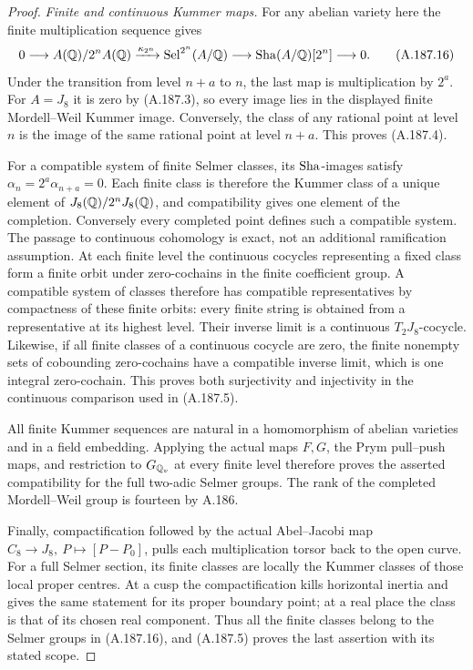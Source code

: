 \begin{proof}
\emph{Finite and continuous Kummer maps.}
For any abelian variety here the finite multiplication
sequence gives
\[
0\longrightarrow A(\mathbb Q)/2^nA(\mathbb Q)
 \xrightarrow{\kappa_{2^n}}\operatorname{Sel}^{2^n}(A/\mathbb Q)
 \longrightarrow\operatorname{Sha}(A/\mathbb Q)[2^n]\longrightarrow0.
\tag{A.187.16}
\]
Under the transition from level \(n+a\) to \(n\),
the last map is multiplication by \(2^a\).  For
\(A=J_8\) it is zero by (A.187.3), so every image
lies in the displayed finite Mordell--Weil Kummer
image.  Conversely, the class of any rational point
at level \(n\) is the image of the same rational
point at level \(n+a\).  This proves (A.187.4).

For a compatible system of finite Selmer classes,
its \(\operatorname{Sha}\)-images satisfy \(\alpha_n=2^a\alpha_{n+a}=0\).
Each finite class is therefore the Kummer class of a
unique element of \(J_8(\mathbb Q)/2^nJ_8(\mathbb Q)\), and
compatibility gives one element of the completion.
Conversely every completed point defines such a
compatible system.  The passage to continuous
cohomology is exact, not an additional ramification
assumption.  At each finite level the continuous
cocycles representing a fixed class form a finite
orbit under zero-cochains in the finite coefficient
group.  A compatible system of classes therefore
has compatible representatives by compactness of
these finite orbits: every finite string is obtained
from a representative at its highest level.
Their inverse limit is a continuous \(T_2J_8\)-cocycle.
Likewise, if all finite classes of a continuous
cocycle are zero, the finite nonempty sets of
cobounding zero-cochains have a compatible inverse
limit, which is one integral zero-cochain.  This
proves both surjectivity and injectivity in the
continuous comparison used in (A.187.5).

All finite Kummer sequences are natural in a
homomorphism of abelian varieties and in a field
embedding.  Applying the actual maps \(F,G\),
the Prym pull--push maps, and restriction to
\(G_{\mathbb Q_v}\) at every finite level therefore
proves the asserted compatibility for the full
two-adic Selmer groups.  The rank of the completed
Mordell--Weil group is fourteen by A.186.

Finally, compactification followed by the actual
Abel--Jacobi map
\(C_8\to J_8,\ P\mapsto[P-P_0]\), pulls each
multiplication torsor back to the open curve.
For a full Selmer section, its finite classes are
locally the Kummer classes of those local proper
centres.  At a cusp the compactification kills
horizontal inertia and gives the same statement
for its proper boundary point; at a real place
the class is that of its chosen real component.
Thus all the finite classes belong to the Selmer
groups in (A.187.16), and (A.187.5) proves the
last assertion with its stated scope.
\end{proof}
